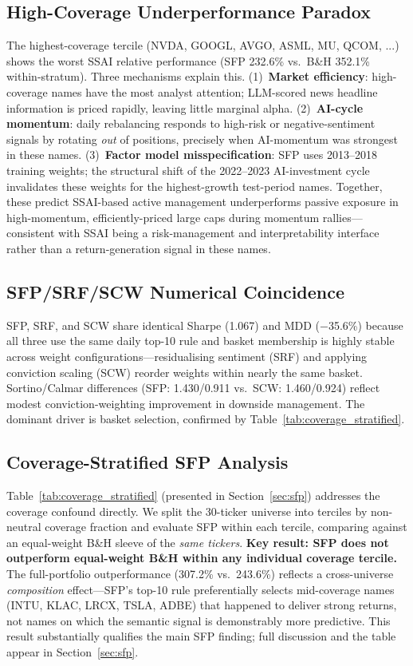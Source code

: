\documentclass{article}
\begin{document}
\subsection{High-Coverage Underperformance Paradox}
\label{app:coverage_paradox}

The highest-coverage tercile (NVDA, GOOGL, AVGO, ASML, MU, QCOM, ...) shows the worst SSAI relative performance (SFP 232.6\% vs.\ B\&H 352.1\% within-stratum). Three mechanisms explain this. (1)~\textbf{Market efficiency}: high-coverage names have the most analyst attention; LLM-scored news headline information is priced rapidly, leaving little marginal alpha. (2)~\textbf{AI-cycle momentum}: daily rebalancing responds to high-risk or negative-sentiment signals by rotating \emph{out} of positions, precisely when AI-momentum was strongest in these names. (3)~\textbf{Factor model misspecification}: SFP uses 2013--2018 training weights; the structural shift of the 2022--2023 AI-investment cycle invalidates these weights for the highest-growth test-period names. Together, these predict SSAI-based active management underperforms passive exposure in high-momentum, efficiently-priced large caps during momentum rallies---consistent with SSAI being a risk-management and interpretability interface rather than a return-generation signal in these names.

\subsection{SFP/SRF/SCW Numerical Coincidence}
\label{app:sfp_coincidence}
SFP, SRF, and SCW share identical Sharpe (1.067) and MDD ($-$35.6\%) because all three use the same daily top-10 rule and basket membership is highly stable across weight configurations---residualising sentiment (SRF) and applying conviction scaling (SCW) reorder weights within nearly the same basket. Sortino/Calmar differences (SFP: 1.430/0.911 vs.\ SCW: 1.460/0.924) reflect modest conviction-weighting improvement in downside management. The dominant driver is basket selection, confirmed by Table~\ref{tab:coverage_stratified}.

\subsection{Coverage-Stratified SFP Analysis}
\label{sec:coverage_stratified}

Table~\ref{tab:coverage_stratified} (presented in Section~\ref{sec:sfp}) addresses the coverage confound directly.
We split the 30-ticker universe into terciles by non-neutral coverage fraction and evaluate SFP within each tercile, comparing against an equal-weight B\&H sleeve of the \emph{same tickers}.
\textbf{Key result: SFP does not outperform equal-weight B\&H within any individual coverage tercile.}
The full-portfolio outperformance (307.2\% vs.\ 243.6\%) reflects a cross-universe \emph{composition} effect---SFP's top-10 rule preferentially selects mid-coverage names (INTU, KLAC, LRCX, TSLA, ADBE) that happened to deliver strong returns, not names on which the semantic signal is demonstrably more predictive.
This result substantially qualifies the main SFP finding; full discussion and the table appear in Section~\ref{sec:sfp}.
\end{document}
